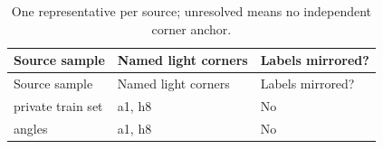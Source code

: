 \begingroup\small
\setlength{\tabcolsep}{4pt}
\begin{longtable}{>{\raggedright\arraybackslash}p{.47\linewidth}>{\raggedright\arraybackslash}p{.25\linewidth}l}
\caption{One representative per source; unresolved means no independent corner anchor.}\label{tab:conventions}\\
\toprule
Source sample & %
Named light corners & %
Labels mirrored? \\ %
\midrule

\endfirsthead
\toprule
Source sample & %
Named light corners & %
Labels mirrored? \\ %
\midrule

\endhead
\bottomrule\endfoot
private train set & %
a1, h8 & %
No \\ %

angles & %
a1, h8 & %
No \\ %


\end{longtable}
